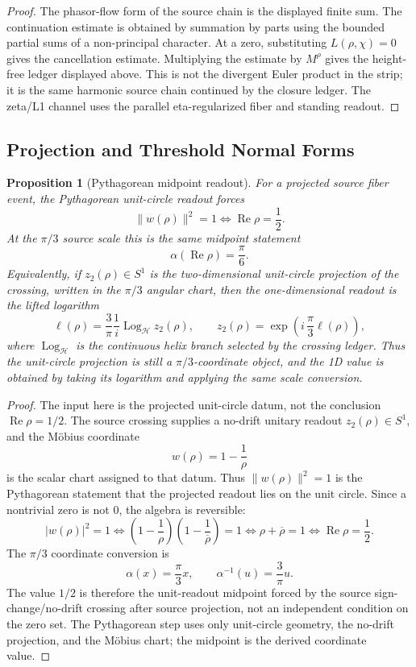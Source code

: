 \documentclass[11pt]{article}
\newtheorem{proposition}[definition]{Proposition}
\DeclareMathOperator{\Ree}{Re}
\DeclareMathOperator{\Log}{Log}
\begin{document}
\begin{proof}
The phasor-flow form of the source chain is the displayed finite sum.  The
continuation estimate is obtained by summation by parts using the bounded
partial sums of a non-principal character.  At a zero, substituting
$L(\rho,\chi)=0$ gives the cancellation estimate.  Multiplying the estimate by
$M^\rho$ gives the height-free ledger displayed above.
This is not the divergent Euler product in the strip; it is the same harmonic
source chain continued by the closure ledger.  The zeta/L1 channel uses the
parallel eta-regularized fiber and standing readout.
\end{proof}

\subsection{Projection and Threshold Normal Forms}

\begin{proposition}[Pythagorean midpoint readout]
For a projected source fiber event, the Pythagorean unit-circle readout forces
\[
  \lVert w(\rho)\rVert^2=1
  \Longleftrightarrow
  \Ree\rho=\frac12.
\]
At the $\pi/3$ source scale this is the same midpoint statement
\[
  \alpha(\Ree\rho)=\frac{\pi}{6}.
\]
Equivalently, if $z_2(\rho)\in S^1$ is the two-dimensional unit-circle
projection of the crossing, written in the $\pi/3$ angular chart, then the
one-dimensional readout is the lifted logarithm
\[
  \ell(\rho)
  =
  \frac{3}{\pi}\frac{1}{i}\Log_{\mathcal H} z_2(\rho),
  \qquad
  z_2(\rho)=\exp\!\left(i\,\frac{\pi}{3}\ell(\rho)\right),
\]
where $\Log_{\mathcal H}$ is the continuous helix branch selected by the
crossing ledger.  Thus the unit-circle projection is still a $\pi/3$-coordinate
object, and the 1D value is obtained by taking its logarithm and applying the
same scale conversion.
\end{proposition}

\begin{proof}
The input here is the projected unit-circle datum, not the conclusion
$\Ree\rho=1/2$.  The source crossing supplies a no-drift unitary readout
$z_2(\rho)\in S^1$, and the Möbius coordinate
\[
  w(\rho)=1-\frac1\rho
\]
is the scalar chart assigned to that datum.  Thus
$\lVert w(\rho)\rVert^2=1$ is the Pythagorean statement that the
projected readout lies on the unit circle.  Since a nontrivial zero is not
$0$, the algebra is reversible:
\[
  |w(\rho)|^2=1
  \Longleftrightarrow
  \left(1-\frac1\rho\right)\left(1-\frac1{\overline\rho}\right)=1
  \Longleftrightarrow
  \rho+\overline\rho=1
  \Longleftrightarrow
  \Ree\rho=\frac12.
\]
The $\pi/3$ coordinate conversion is
\[
  \alpha(x)=\frac{\pi}{3}x,
  \qquad
  \alpha^{-1}(u)=\frac3\pi u.
\]
The value $1/2$ is therefore the unit-readout midpoint forced by the source
sign-change/no-drift crossing after source projection, not an independent
condition on the zero set.  The Pythagorean step uses only unit-circle
geometry, the no-drift projection, and the Möbius chart; the midpoint is the
derived coordinate value.
\end{proof}
\end{document}

